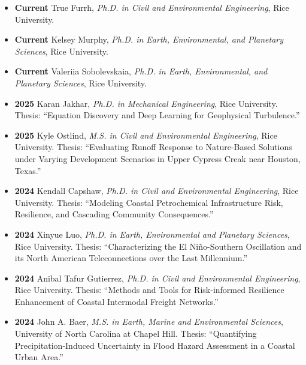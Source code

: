 \documentclass[10pt,oneside]{article}
\begin{document}
\mbox{}\vspace{-\dimexpr\baselineskip\relax}

\begin{itemize}[label={}]

  
    \item \textbf{Current} True Furrh, \textit{Ph.D. in Civil and Environmental Engineering}, Rice University. 
  
    \item \textbf{Current} Kelsey Murphy, \textit{Ph.D. in Earth, Environmental, and Planetary Sciences}, Rice University. 
  
    \item \textbf{Current} Valeriia Sobolevskaia, \textit{Ph.D. in Earth, Environmental, and Planetary Sciences}, Rice University. 
  
  
  
    \item \textbf{2025} \quad Karan Jakhar, \textit{Ph.D. in Mechanical Engineering}, Rice University. Thesis: \enquote{Equation Discovery and Deep Learning for Geophysical Turbulence.}
  
    \item \textbf{2025} \quad Kyle Ostlind, \textit{M.S. in Civil and Environmental Engineering}, Rice University. Thesis: \enquote{Evaluating Runoff Response to Nature-Based Solutions under Varying Development Scenarios in Upper Cypress Creak near Houston, Texas.}
  
    \item \textbf{2024} \quad Kendall Capshaw, \textit{Ph.D. in Civil and Environmental Engineering}, Rice University. Thesis: \enquote{Modeling Coastal Petrochemical Infrastructure Risk, Resilience, and Cascading Community Consequences.}
  
    \item \textbf{2024} \quad Xinyue Luo, \textit{Ph.D. in Earth, Environmental and Planetary Sciences}, Rice University. Thesis: \enquote{Characterizing the El Niño-Southern Oscillation and its North American Teleconnections over the Last Millennium.}
  
    \item \textbf{2024} \quad Anibal Tafur Gutierrez, \textit{Ph.D. in Civil and Environmental Engineering}, Rice University. Thesis: \enquote{Methods and Tools for Risk-informed Resilience Enhancement of Coastal Intermodal Freight Networks.}
  
    \item \textbf{2024} \quad John A. Baer, \textit{M.S. in Earth, Marine and Environmental Sciences}, University of North Carolina at Chapel Hill. Thesis: \enquote{Quantifying Precipitation-Induced Uncertainty in Flood Hazard Assessment in a Coastal Urban Area.}
  

\end{itemize}
\end{document}
